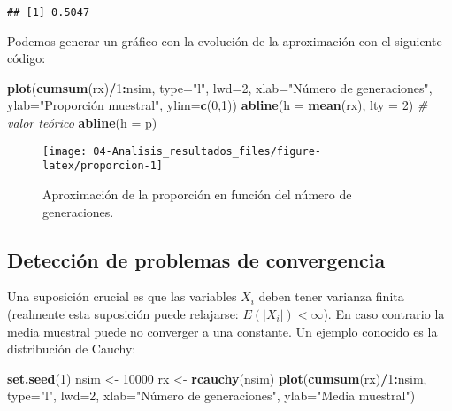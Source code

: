 \documentclass[
]{book}
\newenvironment{Shaded}{\begin{snugshade}}{\end{snugshade}}
\newcommand{\CommentTok}[1]{\textcolor[rgb]{0.56,0.35,0.01}{\textit{#1}}}
\newcommand{\DataTypeTok}[1]{\textcolor[rgb]{0.13,0.29,0.53}{#1}}
\newcommand{\DecValTok}[1]{\textcolor[rgb]{0.00,0.00,0.81}{#1}}
\newcommand{\KeywordTok}[1]{\textcolor[rgb]{0.13,0.29,0.53}{\textbf{#1}}}
\newcommand{\NormalTok}[1]{#1}
\newcommand{\OperatorTok}[1]{\textcolor[rgb]{0.81,0.36,0.00}{\textbf{#1}}}
\newcommand{\StringTok}[1]{\textcolor[rgb]{0.31,0.60,0.02}{#1}}
\theoremstyle{break}
\theoremstyle{definition}
\theoremstyle{definition}
\theoremstyle{definition}
\theoremstyle{remark}
\begin{document}
\begin{verbatim}
## [1] 0.5047
\end{verbatim}

Podemos generar un gráfico con la evolución de la aproximación con el siguiente código:

\begin{Shaded}
\begin{Highlighting}[]
\KeywordTok{plot}\NormalTok{(}\KeywordTok{cumsum}\NormalTok{(rx)}\OperatorTok{/}\DecValTok{1}\OperatorTok{:}\NormalTok{nsim, }\DataTypeTok{type=}\StringTok{"l"}\NormalTok{, }\DataTypeTok{lwd=}\DecValTok{2}\NormalTok{, }\DataTypeTok{xlab=}\StringTok{"Número de generaciones"}\NormalTok{, }
     \DataTypeTok{ylab=}\StringTok{"Proporción muestral"}\NormalTok{, }\DataTypeTok{ylim=}\KeywordTok{c}\NormalTok{(}\DecValTok{0}\NormalTok{,}\DecValTok{1}\NormalTok{))}
\KeywordTok{abline}\NormalTok{(}\DataTypeTok{h =} \KeywordTok{mean}\NormalTok{(rx), }\DataTypeTok{lty =} \DecValTok{2}\NormalTok{)}
\CommentTok{# valor teórico}
\KeywordTok{abline}\NormalTok{(}\DataTypeTok{h =}\NormalTok{ p) }
\end{Highlighting}
\end{Shaded}

\begin{figure}[!htb]

{\centering \texttt{[image: 04-Analisis\_resultados\_files/figure-latex/proporcion-1]} 

}

\caption{Aproximación de la proporción en función del número de generaciones.}\label{fig:proporcion}
\end{figure}

\hypertarget{detecciuxf3n-de-problemas-de-convergencia}{%
\subsection{Detección de problemas de convergencia}\label{detecciuxf3n-de-problemas-de-convergencia}}

Una suposición crucial es que las variables \(X_{i}\) deben tener
varianza finita (realmente esta suposición puede relajarse:
\(E\left( \left\vert X_{i} \right\vert \right) < \infty\)).
En caso contrario la media muestral puede no converger a
una constante. Un ejemplo conocido es la distribución de Cauchy:

\begin{Shaded}
\begin{Highlighting}[]
\KeywordTok{set.seed}\NormalTok{(}\DecValTok{1}\NormalTok{)}
\NormalTok{nsim <-}\StringTok{ }\DecValTok{10000}
\NormalTok{rx <-}\StringTok{ }\KeywordTok{rcauchy}\NormalTok{(nsim)}
\KeywordTok{plot}\NormalTok{(}\KeywordTok{cumsum}\NormalTok{(rx)}\OperatorTok{/}\DecValTok{1}\OperatorTok{:}\NormalTok{nsim, }\DataTypeTok{type=}\StringTok{"l"}\NormalTok{, }\DataTypeTok{lwd=}\DecValTok{2}\NormalTok{, }
     \DataTypeTok{xlab=}\StringTok{"Número de generaciones"}\NormalTok{, }\DataTypeTok{ylab=}\StringTok{"Media muestral"}\NormalTok{)}
\end{Highlighting}
\end{Shaded}
\end{document}

